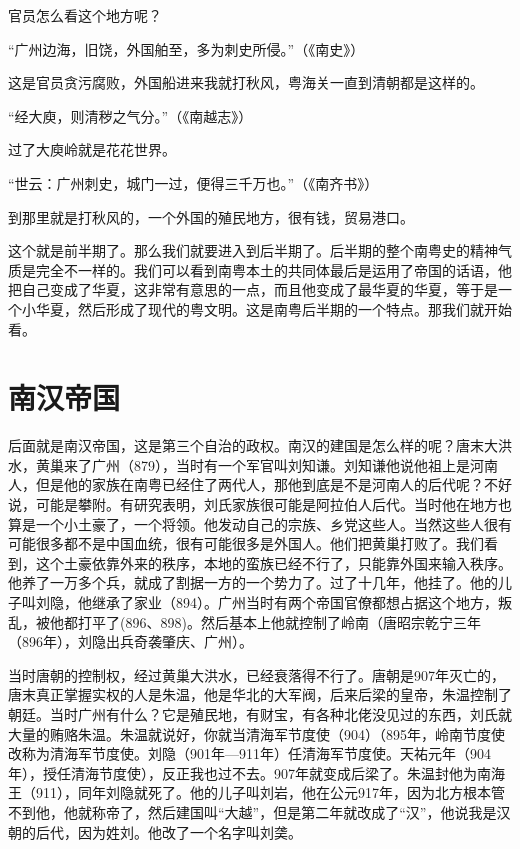 官员怎么看这个地方呢？

“广州边海，旧饶，外国舶至，多为刺史所侵。”（《南史》）

这是官员贪污腐败，外国船进来我就打秋风，粤海关一直到清朝都是这样的。

“经大庾，则清秽之气分。”（《南越志》）

过了大庾岭就是花花世界。

“世云：广州刺史，城门一过，便得三千万也。”（《南齐书》）

到那里就是打秋风的，一个外国的殖民地方，很有钱，贸易港口。

这个就是前半期了。那么我们就要进入到后半期了。后半期的整个南粤史的精神气质是完全不一样的。我们可以看到南粤本土的共同体最后是运用了帝国的话语，他把自己变成了华夏，这非常有意思的一点，而且他变成了最华夏的华夏，等于是一个小华夏，然后形成了现代的粤文明。这是南粤后半期的一个特点。那我们就开始看。

\section{南汉帝国}

后面就是南汉帝国，这是第三个自治的政权。南汉的建国是怎么样的呢？唐末大洪水，黄巢来了广州（879），当时有一个军官叫刘知谦。刘知谦他说他祖上是河南人，但是他的家族在南粤已经住了两代人，那他到底是不是河南人的后代呢？不好说，可能是攀附。有研究表明，刘氏家族很可能是阿拉伯人后代。当时他在地方也算是一个小土豪了，一个将领。他发动自己的宗族、乡党这些人。当然这些人很有可能很多都不是中国血统，很有可能很多是外国人。他们把黄巢打败了。我们看到，这个土豪依靠外来的秩序，本地的蛮族已经不行了，只能靠外国来输入秩序。他养了一万多个兵，就成了割据一方的一个势力了。过了十几年，他挂了。他的儿子叫刘隐，他继承了家业（894）。广州当时有两个帝国官僚都想占据这个地方，叛乱，被他都打平了(896、898)。然后基本上他就控制了岭南（唐昭宗乾宁三年（896年），刘隐出兵奇袭肇庆、广州）。

当时唐朝的控制权，经过黄巢大洪水，已经衰落得不行了。唐朝是907年灭亡的，唐末真正掌握实权的人是朱温，他是华北的大军阀，后来后梁的皇帝，朱温控制了朝廷。当时广州有什么？它是殖民地，有财宝，有各种北佬没见过的东西，刘氏就大量的贿赂朱温。朱温就说好，你就当清海军节度使（904）（895年，岭南节度使改称为清海军节度使。刘隐（901年—911年）任清海军节度使。天祐元年（904年），授任清海节度使），反正我也过不去。907年就变成后梁了。朱温封他为南海王（911），同年刘隐就死了。他的儿子叫刘岩，他在公元917年，因为北方根本管不到他，他就称帝了，然后建国叫“大越”，但是第二年就改成了“汉”，他说我是汉朝的后代，因为姓刘。他改了一个名字叫刘䶮。

